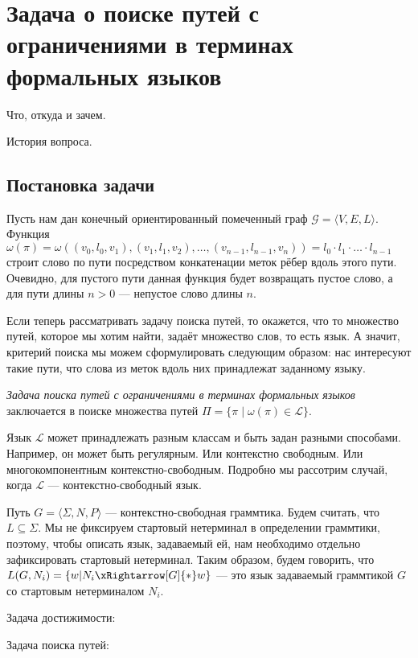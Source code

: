 \section{Задача о поиске путей с ограничениями в терминах формальных языков}


Что, откуда и зачем.

История вопроса.


\subsection{Постановка задачи }


Пусть нам дан конечный ориентированный помеченный граф $\mathcal{G}=\langle V,E,L \rangle$.
Функция $\omega(\pi) = \omega((v_0, l_0, v_1),(v_1,l_1,v_2),\dots,(v_{n-1},l_{n-1},v_n)) = l_0 \cdot l_1 \cdot \ldots \cdot l_{n-1} $ строит слово по пути посредством конкатенации меток рёбер вдоль этого пути.
Очевидно, для пустого пути данная функция будет возвращать пустое слово, а для пути длины $n  > 0$ --- непустое слово длины $n$.

Если теперь рассматривать задачу поиска путей, то окажется, что то множество путей, которое мы хотим найти, задаёт множество слов, то есть язык.
А значит, критерий поиска мы можем сформулировать следующим образом: нас интересуют такие пути, что слова из меток вдоль них принадлежат заданному языку.
\begin{definition}
\textit{Задача поиска путей с ограничениями в терминах формальных языков} заключается в поиске множества путей $\Pi = \{\pi \mid \omega(\pi) \in \mathcal{L}\}$.
\end{definition}

Язык $\mathcal{L}$ может принадлежать разным классам и быть задан разными способами.
Например, он может быть регулярным.
Или контекстно свободным.
Или многокомпонентным контекстно-свободным.
Подробно мы рассотрим случай, когда $\mathcal{L}$ --- контекстно-свободный язык.

Путь $G = \langle \Sigma, N, P \rangle$ --- контекстно-свободная граммтика.
Будем считать, что $L \subseteq \Sigma$.
Мы не фиксируем стартовый нетерминал в определении граммтики, поэтому, чтобы описать язык, задаваемый ей, нам необходимо отдельно зафиксировать стартовый нетерминал.
Таким образом, будем говорить, что $L(G,N_i) = \{ w | N_i \xRightarrow[G]{*} w  \}$ --- это язык задаваемый граммтикой $G$ со стартовым нетерминалом $N_i$.

Задача достижимости:

Задача поиска путей:

